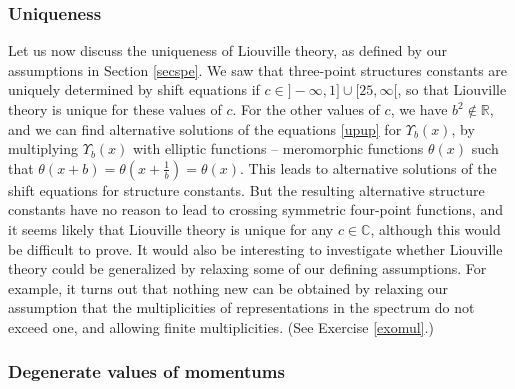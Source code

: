 \documentclass[12pt, a4paper, notitlepage, twoside]{report}
\numberwithin{equation}{section}
\theoremstyle{break}
\begin{document}
\subsubsection{Uniqueness}

Let us now discuss the uniqueness of Liouville theory, as defined by our assumptions in Section \ref{secspe}. 
We saw that three-point structures constants are uniquely determined by shift equations if $c\in ]-\infty, 1] \cup [25,\infty[$, so that Liouville theory is unique for these values of $c$. 
For the other values of $c$, we have $b^2\notin\mathbb{R}$, and we can find alternative solutions of the equations \eqref{upup} for $\Upsilon_b(x)$, by multiplying $\Upsilon_b(x)$ with elliptic functions -- meromorphic functions $\theta(x)$ such that $\theta(x+b)=\theta(x+\frac{1}{b}) = \theta(x)$.
This leads to alternative solutions of the shift equations for structure constants.
But the resulting alternative structure constants have no reason to lead to crossing symmetric four-point functions, and it seems likely that Liouville theory is unique for any $c\in\mathbb{C}$, although this would be difficult to prove. 
It would also be interesting to investigate whether Liouville theory could be generalized by relaxing some of our defining assumptions. 
For example, it turns out that nothing new can be obtained by relaxing our assumption that the multiplicities of representations in the spectrum do not exceed one, and allowing finite multiplicities. (See Exercise \ref{exomul}.)

\subsubsection{Degenerate values of momentums}
\end{document}

